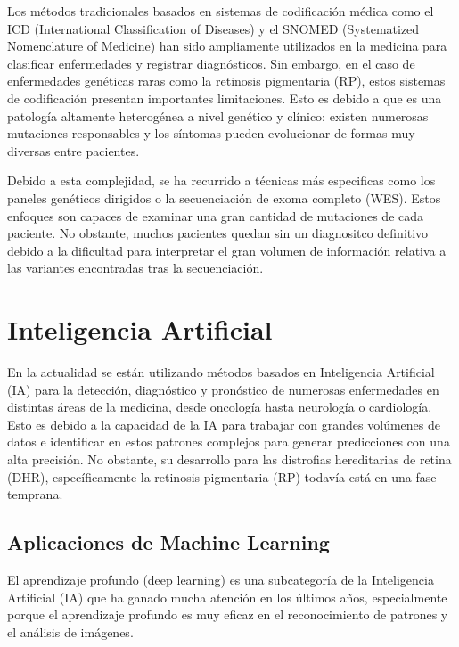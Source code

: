 \documentclass[11pt,spanish,listoffigures,listoftables]{tfgetsinf}
\begin{document}
Los métodos tradicionales basados en sistemas de codificación médica como el ICD (International Classification of Diseases) y el SNOMED (Systematized Nomenclature of Medicine) han sido ampliamente utilizados en la medicina para clasificar enfermedades y registrar diagnósticos. Sin embargo, en el caso de enfermedades genéticas raras como la retinosis pigmentaria (\acs{RP}), estos sistemas de codificación presentan importantes limitaciones\cite{VER}. Esto es debido a que es una patología altamente heterogénea a nivel genético y clínico: existen numerosas mutaciones responsables y los síntomas pueden evolucionar de formas muy diversas entre pacientes\cite{HAR}. 

Debido a esta complejidad, se ha recurrido a técnicas más especificas como los paneles genéticos dirigidos o la secuenciación de exoma completo (\acs{WES}). Estos enfoques son capaces de examinar una gran cantidad de mutaciones de cada paciente. No obstante, muchos pacientes quedan sin un diagnositco definitivo debido a la dificultad para interpretar el gran volumen de información relativa a las variantes encontradas tras la secuenciación.

\section{Inteligencia Artificial}

En la actualidad se están utilizando métodos basados en Inteligencia Artificial (\acs{IA}) para la detección, diagnóstico y pronóstico de numerosas enfermedades en distintas áreas de la medicina, desde oncología hasta neurología o cardiología. Esto es debido a la capacidad de la \acs{IA} para trabajar con grandes volúmenes de datos e identificar en estos patrones complejos para generar predicciones con una alta precisión\cite{FER}. No obstante, su desarrollo para las distrofias hereditarias de retina (\acs{DHR}), específicamente la retinosis pigmentaria (\acs{RP}) todavía está en una fase temprana.

\subsection{Aplicaciones de Machine Learning}

El aprendizaje profundo (deep learning) es una subcategoría de la Inteligencia Artificial (\acs{IA}) que ha ganado mucha atención en los últimos años, especialmente porque el aprendizaje profundo es muy eficaz en el reconocimiento de patrones y el análisis de imágenes\cite{STE}.
\end{document}
